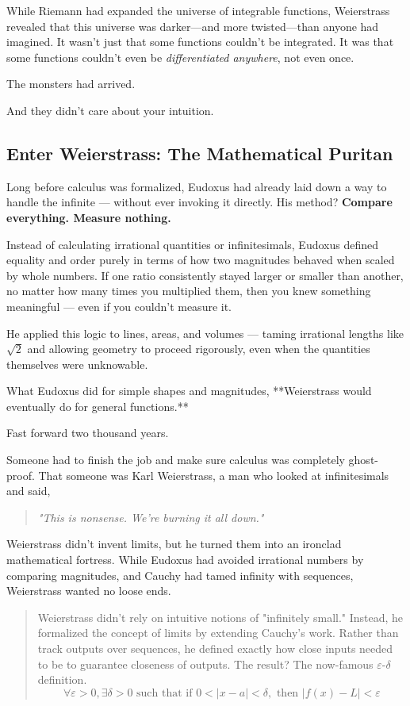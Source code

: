 While Riemann had expanded the universe of integrable functions, Weierstrass revealed that this universe was darker—and more twisted—than anyone had imagined. It wasn’t just that some functions couldn’t be integrated. It was that some functions couldn’t even be \emph{differentiated anywhere}, not even once.

The monsters had arrived.

And they didn’t care about your intuition.


\subsection{Enter Weierstrass: The Mathematical Puritan}  

Long before calculus was formalized, Eudoxus had already laid down a way to handle the infinite — without ever invoking it directly. His method?  
\textbf{Compare everything. Measure nothing.}  

Instead of calculating irrational quantities or infinitesimals, Eudoxus defined equality and order purely in terms of how two magnitudes behaved when scaled by whole numbers. If one ratio consistently stayed larger or smaller than another, no matter how many times you multiplied them, then you knew something meaningful — even if you couldn’t measure it.

He applied this logic to lines, areas, and volumes — taming irrational lengths like \( \sqrt{2} \) and allowing geometry to proceed rigorously, even when the quantities themselves were unknowable.  

What Eudoxus did for simple shapes and magnitudes, **Weierstrass would eventually do for general functions.**

Fast forward two thousand years.

Someone had to finish the job and make sure calculus was completely ghost-proof. That someone was Karl Weierstrass, a man who looked at infinitesimals and said,  

\begin{quote}
    \textit{"This is nonsense. We're burning it all down."}
\end{quote}

Weierstrass didn’t invent limits, but he turned them into an ironclad mathematical fortress. While Eudoxus had avoided irrational numbers by comparing magnitudes, and Cauchy had tamed infinity with sequences, Weierstrass wanted no loose ends.

\begin{quote}
Weierstrass didn’t rely on intuitive notions of "infinitely small." Instead, he formalized the concept of limits by extending Cauchy’s work. Rather than track outputs over sequences, he defined exactly how close inputs needed to be to guarantee closeness of outputs. The result? The now-famous \(\varepsilon\)-\(\delta\) definition.
\[
\forall \varepsilon > 0, \exists \delta > 0 \text{ such that if } 0 < |x - a| < \delta, \text{ then } |f(x) - L| < \varepsilon
\]
\end{quote}

